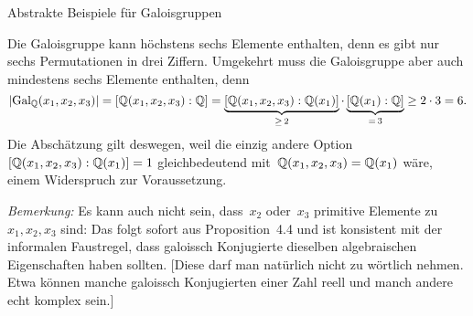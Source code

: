 \documentclass{algblatt}
\begin{document}
\begin{aufgabe}{Abstrakte Beispiele für Galoisgruppen}
\begin{loesungE}
\item Die Galoisgruppe kann höchstens sechs Elemente enthalten, denn es gibt
nur sechs Permutationen in drei Ziffern. Umgekehrt muss die Galoisgruppe aber
auch mindestens sechs Elemente enthalten, denn
\[ |\mathrm{Gal}_{\mathbb{Q}}(x_1,x_2,x_3)| = [\mathbb{Q}(x_1,x_2,x_3):\mathbb{Q}] =
  \underbrace{[\mathbb{Q}(x_1,x_2,x_3):\mathbb{Q}(x_1)]}_{\geq\,2} \cdot
  \underbrace{[\mathbb{Q}(x_1):\mathbb{Q}]}_{=\,3} \geq
  2 \cdot 3 = 6. \]
Die Abschätzung gilt deswegen, weil die einzig andere
Option~$[\mathbb{Q}(x_1,x_2,x_3):\mathbb{Q}(x_1)] = 1$ gleichbedeutend
mit~$\mathbb{Q}(x_1,x_2,x_3) = \mathbb{Q}(x_1)$ wäre, einem Widerspruch zur Voraussetzung.

\emph{Bemerkung:} Es kann auch nicht sein, dass~$x_2$ oder~$x_3$
primitive Elemente zu~$x_1, x_2, x_3$ sind: Das folgt sofort aus
Proposition~4.4 und ist konsistent mit der informalen Faustregel, dass
galoissch Konjugierte dieselben algebraischen Eigenschaften haben sollten.
[Diese darf man natürlich nicht zu wörtlich nehmen. Etwa können manche
galoissch Konjugierten einer Zahl reell und manch andere echt komplex sein.]
\end{loesungE}
\end{aufgabe}
\end{document}
